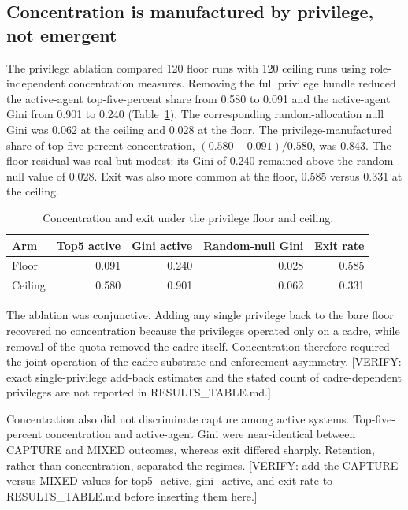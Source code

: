\subsection{Concentration is manufactured by privilege, not emergent}

The privilege ablation compared 120 floor runs with 120 ceiling runs using role-independent concentration measures. Removing the full privilege bundle reduced the active-agent top-five-percent share from 0.580 to 0.091 and the active-agent Gini from 0.901 to 0.240 (Table~\ref{tab:privilege-ablation}). The corresponding random-allocation null Gini was 0.062 at the ceiling and 0.028 at the floor. The privilege-manufactured share of top-five-percent concentration, $(0.580-0.091)/0.580$, was 0.843. The floor residual was real but modest: its Gini of 0.240 remained above the random-null value of 0.028. Exit was also more common at the floor, 0.585 versus 0.331 at the ceiling.

\begin{table}[htbp]
\centering
\caption{Concentration and exit under the privilege floor and ceiling.}
\label{tab:privilege-ablation}
\begin{tabular}{lrrrr}
\hline
Arm & Top5 active & Gini active & Random-null Gini & Exit rate \\
\hline
Floor & 0.091 & 0.240 & 0.028 & 0.585 \\
Ceiling & 0.580 & 0.901 & 0.062 & 0.331 \\
\hline
\end{tabular}
\end{table}

The ablation was conjunctive. Adding any single privilege back to the bare floor recovered no concentration because the privileges operated only on a cadre, while removal of the quota removed the cadre itself. Concentration therefore required the joint operation of the cadre substrate and enforcement asymmetry. [VERIFY: exact single-privilege add-back estimates and the stated count of cadre-dependent privileges are not reported in RESULTS_TABLE.md.]

Concentration also did not discriminate capture among active systems. Top-five-percent concentration and active-agent Gini were near-identical between CAPTURE and MIXED outcomes, whereas exit differed sharply. Retention, rather than concentration, separated the regimes. [VERIFY: add the CAPTURE-versus-MIXED values for top5_active, gini_active, and exit rate to RESULTS_TABLE.md before inserting them here.]


